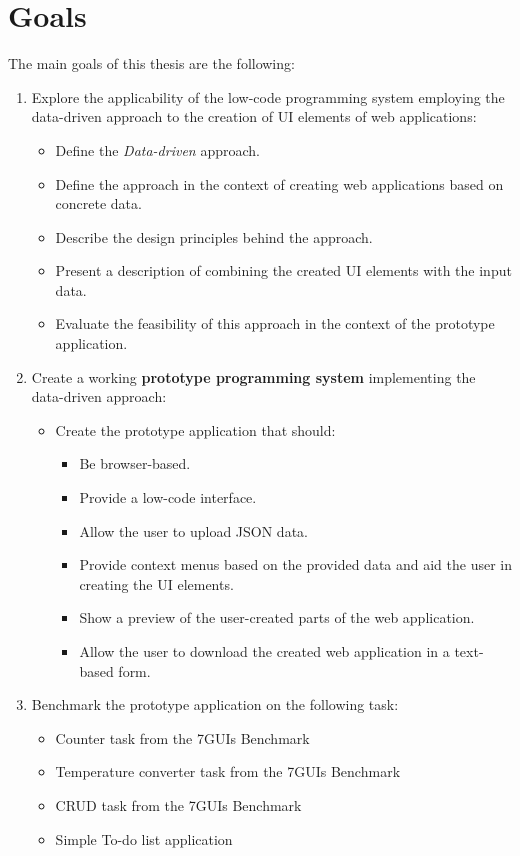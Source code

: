 \section*{Goals}
The main goals of this thesis are the following:
\begin{enumerate}
	\item Explore the applicability of the low-code programming system employing the data-driven approach to the creation of UI elements of web applications:
	      \begin{itemize}
		      \item Define the \emph{Data-driven} approach.
		      \item Define the approach in the context of creating web applications based on concrete data.
		      \item Describe the design principles behind the approach.
		      \item Present a description of combining the created UI elements with the input data.
		      \item Evaluate the feasibility of this approach in the context of the prototype application.
	      \end{itemize}
	\item Create a working \textbf{prototype programming system} implementing the data-driven approach:
	      \begin{itemize}
		      \item Create the prototype application that should:
		            \begin{itemize}
			            \item Be browser-based.
			            \item Provide a low-code interface.
			            \item Allow the user to upload JSON data.
			            \item Provide context menus based on the provided data and aid the user in creating the UI elements.
			            \item Show a preview of the user-created parts of the web application.
			            \item Allow the user to download the created web application in a text-based form.
		            \end{itemize}
	      \end{itemize}
	\item Benchmark the prototype application on the following task:
	      \begin{itemize}
		      \item Counter task from the 7GUIs Benchmark
		      \item Temperature converter task from the 7GUIs Benchmark
		      \item CRUD task from the 7GUIs Benchmark
		      \item Simple To-do list application

	      \end{itemize}
\end{enumerate}


